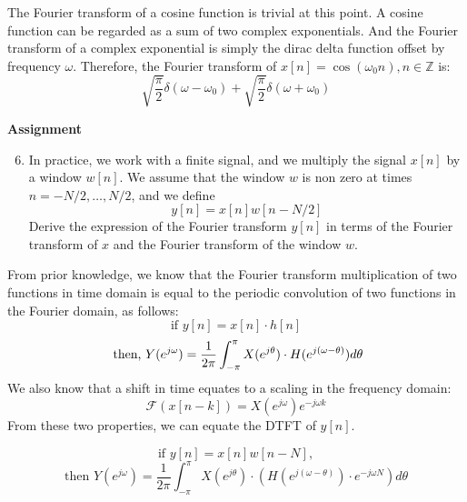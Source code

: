\documentclass{article} %
\begin{document}
The Fourier transform of a cosine function is trivial at this point. A cosine function can be regarded as a sum of two complex exponentials. And the Fourier transform of a complex
exponential is simply the dirac delta function offset by frequency $\omega$. 
Therefore, the Fourier transform of $x[n]=\cos(\omega_0 n), n \in\mathbb{Z}$ is:\\
\[ \sqrt{\frac{\pi}{2}}\delta(\omega-\omega_0)+\sqrt{\frac{\pi}{2}}\delta(\omega+\omega_0)\]


\begin{framed}
\textbf{Assignment}
\begin{enumerate}
\setcounter{enumi}{5}
\item In practice, we work with a finite signal, and we multiply the signal $x[n]$ by a window $w[n]$. We assume that the window $w$ is non zero at times $n=-N/2,\dots,N/2$, 
and we define
\begin{equation} y[n]=x[n]w[n-N/2] \end{equation}
Derive the expression of the Fourier transform $y[n]$ in terms of the Fourier transform of $x$ and the Fourier transform of the window $w$. 
\end{enumerate}
\end{framed}

From prior knowledge, we know that the Fourier transform multiplication of two functions in time domain is equal to the periodic convolution of two functions in the Fourier domain, as follows:
\[\text{if } y[n]=x[n]\cdot h[n] \]
\[\text{ then, }\\
Y(e^{j\omega})=\frac{1}{2\pi}\int_{-\pi}^{\pi}X(e^{j\theta}) \cdot H(e^{j(\omega-\theta)}) d\theta
\]
We also know that a shift in time equates to a scaling in the frequency domain:
\[\mathcal{F}(x[n-k])=X(e^{j\omega})e^{-j\omega k}
\]
From these two properties, we can equate the DTFT of $y[n]$. 

\[\text{if } y[n]=x[n]w[n-N],\]
\[\text{then } Y(e^{j\omega})=\frac{1}{2\pi}\int_{-\pi}^{\pi}X(e^{j\theta}) \cdot (H(e^{j(\omega-\theta)})\cdot e^{-j\omega N}) d\theta\]
\end{document}
